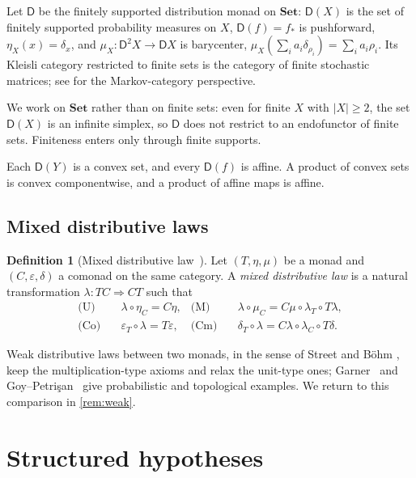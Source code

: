 \documentclass[11pt]{article}
\theoremstyle{definition}
\newtheorem{definition}[theorem]{Definition}
\theoremstyle{remark}
\newcommand{\D}{\mathsf{D}}
\newcommand{\Set}{\mathbf{Set}}
\begin{document}
Let $\D$ be the finitely supported distribution monad on $\Set$: $\D(X)$ is the set of finitely
supported probability measures on $X$, $\D(f)=f_*$ is pushforward, $\eta_X(x)=\delta_x$, and
$\mu_X\colon \D^2X\to\D X$ is barycenter, $\mu_X(\sum_i a_i\delta_{\rho_i})=\sum_i a_i\rho_i$. Its
Kleisli category restricted to finite sets is the category of finite stochastic matrices; see
\cite{Fritz2020,FGPR2023} for the Markov-category perspective.

We work on $\Set$ rather than on finite sets: even for finite $X$ with $|X|\ge 2$, the set $\D(X)$ is
an infinite simplex, so $\D$ does not restrict to an endofunctor of finite sets. Finiteness enters
only through finite supports.

Each $\D(Y)$ is a convex set, and every $\D(f)$ is affine. A product of convex sets is convex
componentwise, and a product of affine maps is affine.

\subsection{Mixed distributive laws}

\begin{definition}[Mixed distributive law~\cite{Beck1969,PowerWatanabe2002}]\label{def:mixed}
Let $(T,\eta,\mu)$ be a monad and $(C,\varepsilon,\delta)$ a comonad on the same category. A
\emph{mixed distributive law} is a natural transformation $\lambda\colon TC\Rightarrow CT$ such that
\begin{align*}
\text{(U)}\quad & \lambda\circ\eta_{C} = C\eta, &
\text{(M)}\quad & \lambda\circ\mu_{C} = C\mu\circ\lambda_{T}\circ T\lambda,\\
\text{(Co)}\quad & \varepsilon_{T}\circ\lambda = T\varepsilon, &
\text{(Cm)}\quad & \delta_{T}\circ\lambda = C\lambda\circ\lambda_{C}\circ T\delta.
\end{align*}
\end{definition}

Weak distributive laws between two monads, in the sense of Street and B\"ohm
\cite{Street2009,Bohm2010,BohmLackStreet2011}, keep the multiplication-type axioms and relax the
unit-type ones; Garner~\cite{Garner2020} and Goy--Petri\c{s}an~\cite{GoyPetrisan2020} give
probabilistic and topological examples. We return to this comparison in \cref{rem:weak}.

\section{Structured hypotheses}\label{sec:hyp}
\end{document}

